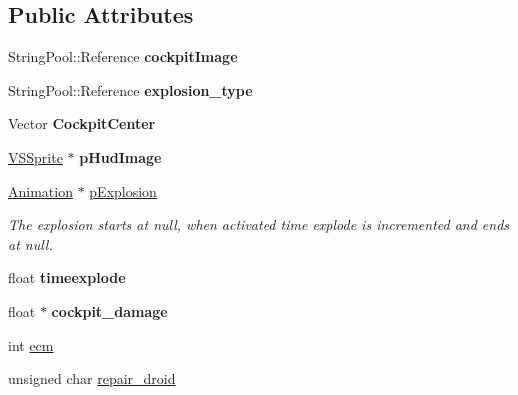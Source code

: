 \subsection*{Public Attributes}
\begin{DoxyCompactItemize}
\item 
String\+Pool\+::\+Reference {\bfseries cockpit\+Image}\hypertarget{structUnitImages_a274c787a83b4725f723c9d5db604f61c}{}\label{structUnitImages_a274c787a83b4725f723c9d5db604f61c}

\item 
String\+Pool\+::\+Reference {\bfseries explosion\+\_\+type}\hypertarget{structUnitImages_ad1ad021e8ae02e454bf99026495e0e79}{}\label{structUnitImages_ad1ad021e8ae02e454bf99026495e0e79}

\item 
Vector {\bfseries Cockpit\+Center}\hypertarget{structUnitImages_ad51e2167afc34a7edce2f0e2cafe705b}{}\label{structUnitImages_ad51e2167afc34a7edce2f0e2cafe705b}

\item 
\hyperlink{classVSSprite}{V\+S\+Sprite} $\ast$ {\bfseries p\+Hud\+Image}\hypertarget{structUnitImages_a61f57b0a0c4e4e26f383e65cb9180ba9}{}\label{structUnitImages_a61f57b0a0c4e4e26f383e65cb9180ba9}

\item 
\hyperlink{classAnimation}{Animation} $\ast$ \hyperlink{structUnitImages_a0d6b49890c522cb58693b1f012e4ec59}{p\+Explosion}\hypertarget{structUnitImages_a0d6b49890c522cb58693b1f012e4ec59}{}\label{structUnitImages_a0d6b49890c522cb58693b1f012e4ec59}

\begin{DoxyCompactList}\small\item\em The explosion starts at null, when activated time explode is incremented and ends at null. \end{DoxyCompactList}\item 
float {\bfseries timeexplode}\hypertarget{structUnitImages_a3a4cde9e968547cf799003a389477c24}{}\label{structUnitImages_a3a4cde9e968547cf799003a389477c24}

\item 
float $\ast$ {\bfseries cockpit\+\_\+damage}\hypertarget{structUnitImages_a22055304245898493f002f00d1dde9b3}{}\label{structUnitImages_a22055304245898493f002f00d1dde9b3}

\item 
int \hyperlink{structUnitImages_a2924a67297f32b1d2f2724ce3c421934}{ecm}
\item 
unsigned char \hyperlink{structUnitImages_a52ba786c89a3a97251d5e13c639ed9cf}{repair\+\_\+droid}\hypertarget{structUnitImages_a52ba786c89a3a97251d5e13c639ed9cf}{}\label{structUnitImages_a52ba786c89a3a97251d5e13c639ed9cf}


\end{DoxyCompactItemize}
